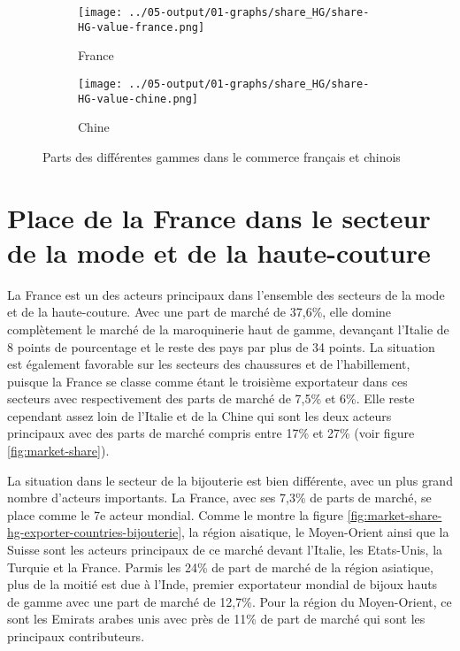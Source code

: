 \documentclass[french,10pt,a4paper]{article}
\begin{document}
\begin{figure}[!h]
  \centering
  \begin{subfigure}{\textwidth}
    \centering    
    \texttt{[image: ../05-output/01-graphs/share\_HG/share-HG-value-france.png]}
    \caption{France}
    \label{fig:share-HG-value-france}
  \end{subfigure}
  \vspace{0.5cm}
  \begin{subfigure}{\textwidth}
    \centering
 \texttt{[image: ../05-output/01-graphs/share\_HG/share-HG-value-chine.png]}
 \caption{Chine}
 \label{fig:share-HG-value-chine}
  \end{subfigure}
  \caption{Parts des différentes gammes dans le commerce français et chinois}
  \label{fig:share-HG-value-france-chine}
\end{figure}




\section{Place de la France dans le secteur de la mode et de la haute-couture}
La France est un des acteurs principaux dans l'ensemble des secteurs de la mode et de la haute-couture. Avec une part de marché de 37,6\%, elle domine complètement le marché de la maroquinerie haut de gamme, devançant l'Italie de 8 points de pourcentage et le reste des pays par plus de 34 points. La situation est également favorable sur les secteurs des chaussures et de l'habillement, puisque la France se classe comme étant le troisième exportateur dans ces secteurs avec respectivement des parts de marché de 7,5\% et 6\%. Elle reste cependant assez loin de l'Italie et de la Chine qui sont les deux acteurs principaux avec des parts de marché compris entre 17\% et 27\% (voir figure \ref{fig:market-share}).

La situation dans le secteur de la bijouterie est bien différente, avec un plus grand nombre d'acteurs importants. La France, avec ses 7,3\% de parts de marché, se place comme le 7e acteur mondial. Comme le montre la figure \ref{fig:market-share-hg-exporter-countries-bijouterie}, la région aisatique, le Moyen-Orient ainsi que la Suisse sont les acteurs principaux de ce marché devant l'Italie, les Etats-Unis, la Turquie et la France. Parmis les 24\% de part de marché de la région asiatique, plus de la moitié est due à l'Inde, premier exportateur mondial de bijoux hauts de gamme avec une part de marché de 12,7\%. Pour la région du Moyen-Orient, ce sont les Emirats arabes unis avec près de 11\% de part de marché qui sont les principaux contributeurs. 
\end{document}
